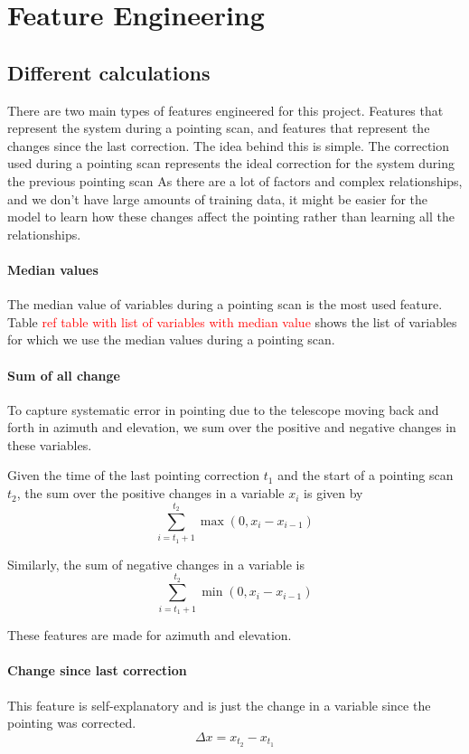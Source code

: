 \section{Feature Engineering}
\subsection{Different calculations}
There are two main types of features engineered for this project.
Features that represent the system during a pointing scan, and features that represent the changes since the last correction. 
The idea behind this is simple. The correction used during a pointing scan represents the ideal correction for the system during the previous pointing scan
As there are a lot of factors and complex relationships, and we don't have large amounts of training data, it might be easier for the model to learn 
how these changes affect the pointing rather than learning all the relationships.

\paragraph{Median values}
The median value of variables during a pointing scan is the most used feature.
Table \textcolor{red}{ref table with list of variables with median value} shows the list of variables for which we use the median values during a pointing scan.
\paragraph{Sum of all change}
To capture systematic error in pointing due to the telescope moving back and forth in azimuth and elevation,
we sum over the positive and negative changes in these variables.

Given the time of the last pointing correction $t_1$ and the start of a pointing scan $t_2$, the sum over the positive changes in a variable $x_i$ is given by
\begin{equation}\label{eq:positive_int}
    \sum_{i=t_1+1}^{t_2} \max(0, x_i-x_{i-1})
\end{equation}

Similarly, the sum of negative changes in a variable is
\begin{equation}\label{eq:negative_int}
    \sum_{i=t_1+1}^{t_2} \min(0, x_i-x_{i-1})
\end{equation}

These features are made for azimuth and elevation.

\paragraph{Change since last correction}
This feature is self-explanatory and is just the change in a variable since the pointing was corrected.
\begin{equation}
    \Delta x = x_{t_2} - x_{t_1}
\end{equation}

